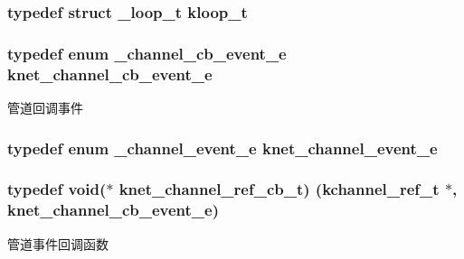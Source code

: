 \subsubsection[{kloop\+\_\+t}]{\setlength{\rightskip}{0pt plus 5cm}typedef struct {\bf \+\_\+loop\+\_\+t} {\bf kloop\+\_\+t}}\label{a00051_a97fc76209a58362019f1ded9169e397f_a97fc76209a58362019f1ded9169e397f}
\hypertarget{a00051_a2fd2faf971268f5b682ab375c455f7c9_a2fd2faf971268f5b682ab375c455f7c9}{}
\subsubsection[{knet\+\_\+channel\+\_\+cb\+\_\+event\+\_\+e}]{\setlength{\rightskip}{0pt plus 5cm}typedef enum {\bf \+\_\+channel\+\_\+cb\+\_\+event\+\_\+e}  {\bf knet\+\_\+channel\+\_\+cb\+\_\+event\+\_\+e}}\label{a00051_a2fd2faf971268f5b682ab375c455f7c9_a2fd2faf971268f5b682ab375c455f7c9}
管道回调事件 \hypertarget{a00051_accd62b4c787cfb91e81aa14210302863_accd62b4c787cfb91e81aa14210302863}{}
\subsubsection[{knet\+\_\+channel\+\_\+event\+\_\+e}]{\setlength{\rightskip}{0pt plus 5cm}typedef enum {\bf \+\_\+channel\+\_\+event\+\_\+e}  {\bf knet\+\_\+channel\+\_\+event\+\_\+e}}\label{a00051_accd62b4c787cfb91e81aa14210302863_accd62b4c787cfb91e81aa14210302863}
\hypertarget{a00051_a8a7d96123ef4565c6d08fe58a10476a9_a8a7d96123ef4565c6d08fe58a10476a9}{}
\subsubsection[{knet\+\_\+channel\+\_\+ref\+\_\+cb\+\_\+t}]{\setlength{\rightskip}{0pt plus 5cm}typedef void($\ast$ knet\+\_\+channel\+\_\+ref\+\_\+cb\+\_\+t) ({\bf kchannel\+\_\+ref\+\_\+t} $\ast$, {\bf knet\+\_\+channel\+\_\+cb\+\_\+event\+\_\+e})}\label{a00051_a8a7d96123ef4565c6d08fe58a10476a9_a8a7d96123ef4565c6d08fe58a10476a9}
管道事件回调函数 \hypertarget{a00051_a74ff83eaafca5c7093accdc65c6b0646_a74ff83eaafca5c7093accdc65c6b0646}{}
